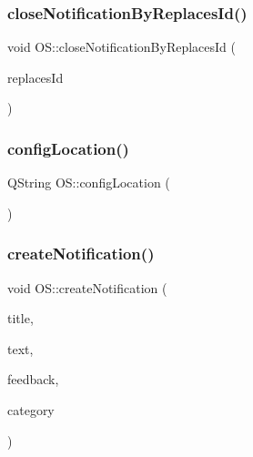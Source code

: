 \mbox{\label{classOS_a8cc3c6824e01ae679819c8c3daf7842e}} 
\subsubsection{\texorpdfstring{close\+Notification\+By\+Replaces\+Id()}{closeNotificationByReplacesId()}}
{\footnotesize\ttfamily void O\+S\+::close\+Notification\+By\+Replaces\+Id (\begin{DoxyParamCaption}\item[{Q\+String}]{replaces\+Id }\end{DoxyParamCaption})}

\mbox{\label{classOS_ae319d1766558e1a93f0d2736d7f898b2}} 
\subsubsection{\texorpdfstring{config\+Location()}{configLocation()}}
{\footnotesize\ttfamily Q\+String O\+S\+::config\+Location (\begin{DoxyParamCaption}{ }\end{DoxyParamCaption})}

\mbox{\label{classOS_ac21113cbcd347809f657c6a27a0278f6}} 
\subsubsection{\texorpdfstring{create\+Notification()}{createNotification()}}
{\footnotesize\ttfamily void O\+S\+::create\+Notification (\begin{DoxyParamCaption}\item[{Q\+String}]{title,  }\item[{Q\+String}]{text,  }\item[{Q\+String}]{feedback,  }\item[{Q\+String}]{category }\end{DoxyParamCaption})}

\mbox{\label{classOS_a949a6aa1c2f8cd63d27cd6b8869da8fc}} 
